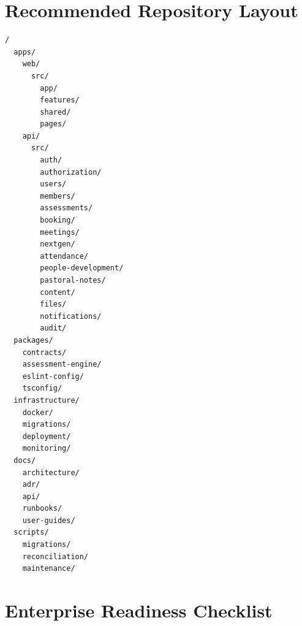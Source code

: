\documentclass[11pt,a4paper,oneside]{report}
\begin{document}
\chapter{Recommended Repository Layout}

\begin{lstlisting}[caption={Recommended mono-repository structure}]
/
  apps/
    web/
      src/
        app/
        features/
        shared/
        pages/
    api/
      src/
        auth/
        authorization/
        users/
        members/
        assessments/
        booking/
        meetings/
        nextgen/
        attendance/
        people-development/
        pastoral-notes/
        content/
        files/
        notifications/
        audit/
  packages/
    contracts/
    assessment-engine/
    eslint-config/
    tsconfig/
  infrastructure/
    docker/
    migrations/
    deployment/
    monitoring/
  docs/
    architecture/
    adr/
    api/
    runbooks/
    user-guides/
  scripts/
    migrations/
    reconciliation/
    maintenance/
\end{lstlisting}

\chapter{Enterprise Readiness Checklist}
\end{document}
